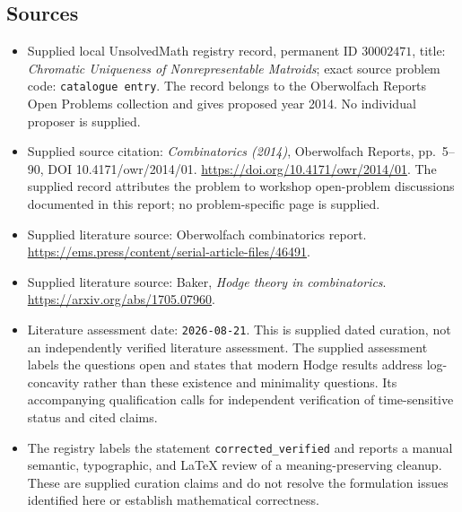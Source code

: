 \documentclass[11pt]{article}
\begin{document}
\subsection{Sources}
\begin{itemize}
\item Supplied local UnsolvedMath registry record, permanent ID \(30002471\), title: \emph{Chromatic Uniqueness of Nonrepresentable Matroids}; exact source problem code: \texttt{catalogue entry}. The record belongs to the Oberwolfach Reports Open Problems collection and gives proposed year 2014. No individual proposer is supplied.
\item Supplied source citation: \emph{Combinatorics (2014)}, Oberwolfach Reports, pp.~5--90, DOI 10.4171/owr/2014/01. \url{https://doi.org/10.4171/owr/2014/01}. The supplied record attributes the problem to workshop open-problem discussions documented in this report; no problem-specific page is supplied.
\item Supplied literature source: Oberwolfach combinatorics report. \url{https://ems.press/content/serial-article-files/46491}.
\item Supplied literature source: Baker, \emph{Hodge theory in combinatorics}. \url{https://arxiv.org/abs/1705.07960}.
\item Literature assessment date: \texttt{2026-08-21}. This is supplied dated curation, not an independently verified literature assessment. The supplied assessment labels the questions open and states that modern Hodge results address log-concavity rather than these existence and minimality questions. Its accompanying qualification calls for independent verification of time-sensitive status and cited claims.
\item The registry labels the statement \texttt{corrected\_verified} and reports a manual semantic, typographic, and LaTeX review of a meaning-preserving cleanup. These are supplied curation claims and do not resolve the formulation issues identified here or establish mathematical correctness.
\end{itemize}
\end{document}
